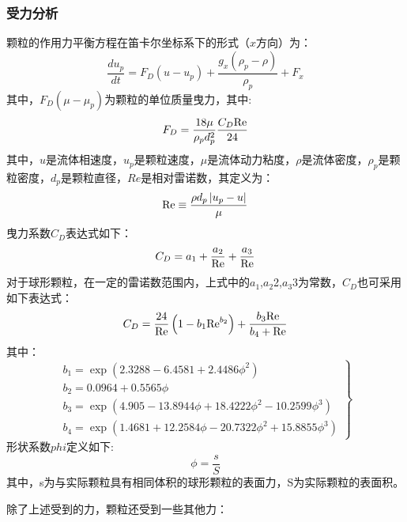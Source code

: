 \subsubsection{受力分析}
颗粒的作用力平衡方程在笛卡尔坐标系下的形式（$x$方向）为：
\begin{equation}
\frac{{d{u_p}}}{{dt}} = {F_D}(u - {u_p}) + \frac{{{g_x}({\rho _p} - \rho )}}{{{\rho _p}}} + {F_x}
\end{equation}
其中，$F_D(\mu-\mu_p)$为颗粒的单位质量曳力，其中:
\begin{equation}
{F_D} = \frac{{18\mu }}{{{\rho _p}d_p^2}}\frac{{{C_D}{\mathop{\rm Re}\nolimits} }}{{24}}
\end{equation}
其中，$u$是流体相速度，$u_p$是颗粒速度，$\mu$是流体动力粘度，$\rho$是流体密度，$\rho_p$是颗粒密度，$d_p$是颗粒直径，$Re$是相对雷诺数，其定义为：
\begin{equation}
{\mathop{\rm Re}\nolimits}  \equiv \frac{{\rho {d_p}\left| {{u_p} - u} \right|}}{\mu }
\end{equation}
曳力系数$C_D$表达式如下：
\begin{equation}
{C_D} = {a_1} + \frac{{{a_2}}}{{{\mathop{\rm Re}\nolimits} }} + \frac{{{a_3}}}{{{\mathop{\rm Re}\nolimits} }}
\end{equation}
对于球形颗粒，在一定的雷诺数范围内，上式中的$a_1$,$a_2$2,$a_3$3为常数，$C_D$也可采用如下表达式：
\begin{equation}
{C_D} = \frac{{24}}{{{\mathop{\rm Re}\nolimits} }}\left( {1 - {b_1}{{{\mathop{\rm Re}\nolimits} }^{{b_2}}}} \right) + \frac{{{b_3}{\mathop{\rm Re}\nolimits} }}{{{b_4} + {\mathop{\rm Re}\nolimits} }}
\end{equation}
其中：
\begin{equation}
\left. \begin{array}{l}
{b_1} = \exp (2.3288 - 6.4581 + 2.4486{\phi ^2})\\
{b_2} = 0.0964 + 0.5565\phi \\
{b_3} = \exp (4.905 - 13.8944\phi  + 18.4222{\phi ^2} - 10.2599{\phi ^3})\\
{b_4} = \exp (1.4681 + 12.2584\phi  - 20.7322{\phi ^2} + 15.8855{\phi ^3})
\end{array} \right\}
\end{equation}
形状系数$phi$定义如下:
\begin{equation}
\phi  = \frac{s}{S}
\end{equation}
其中，s为与实际颗粒具有相同体积的球形颗粒的表面力，S为实际颗粒的表面积。

除了上述受到的力，颗粒还受到一些其他力：

